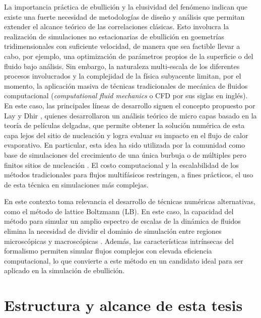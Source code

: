 La importancia pr\'actica de ebullici\'on y la elusividad del fen\'omeno indican que existe una fuerte necesidad de metodolog\'ias de dise\~no y an\'alisis que permitan extender el alcance te\'orico de las correlaciones cl\'asicas. Esto involucra la realizaci\'on de simulaciones no estacionarias de ebullici\'on en goemetr\'ias tridimensionales con suficiente velocidad, de manera que sea factible llevar a cabo, por ejemplo, una optimizaci\'on de par\'ametros propios de la superficie o del fluido bajo an\'alisis. Sin embargo, la naturaleza multi-escala de los diferentes procesos involucrados y la complejidad de la f\'isica subyacente limitan, por el momento, la aplicaci\'on masiva de t\'ecnicas tradicionales de mec\'anica de fluidos computacional (\emph{computational fluid mechanics} o CFD por sus siglas en ingl\'es). En este caso, las principales l\'ineas de desarrollo siguen el concepto propuesto por Lay y Dhir \cite{lay_shape_1995}, quienes desarrollaron un an\'alisis te\'orico de micro capas basado en la teor\'ia de pel\'iculas delgadas, que permite obtener la soluci\'on num\'erica de esta capa lejos del sitio de nucleaci\'on y logra evaluar su impacto en el flujo de calor evaporativo. En particular, esta idea ha sido utilizada por la comunidad como base de simulaciones del crecimiento de una \'unica burbuja o de m\'ultiples pero finitos sitios de nucleaci\'on \cite{son_numerical_1997, son_numerical_1998, dhir_mechanistic_2006}. El costo computacional y la escalabilidad de los m\'etodos tradicionales para flujos multif\'asicos restringen, a fines pr\'acticos, el uso de esta t\'ecnica en simulaciones m\'as complejas.

En este contexto toma relevancia el desarrollo de t\'ecnicas num\'ericas alternativas, como el m\'etodo de lattice Boltzmann (LB). En este caso, la capacidad del m\'etodo para simular un amplio espectro de escalas de la din\'amica de fluidos elimina la necesidad de dividir el dominio de simulaci\'on entre regiones microsc\'opicas y macrosc\'opicas \cite{yazdani_high-fidelity_2016, aidun_lattice-boltzmann_2010}. Adem\'as, las caracter\'isticas intr\'insecas del formalismo permiten simular flujos complejos con elevada eficiencia computacional, lo que convierte a este m\'etodo en un candidato ideal para ser aplicado en la simulaci\'on de ebullici\'on.



\section{Estructura y alcance de esta tesis}

